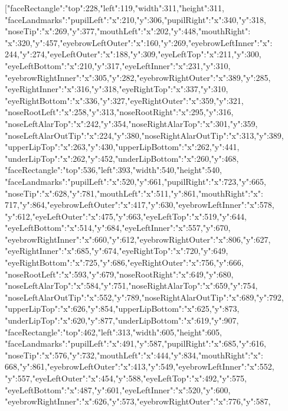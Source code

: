 \begin{myverbbox}[\footnotesize]{\vinput}
[{"faceRectangle":{"top":228,"left":119,"width":311,"height":311},
"faceLandmarks":{"pupilLeft":{"x":210,"y":306},"pupilRight":{"x":340,"y":318},
"noseTip":{"x":269,"y":377},"mouthLeft":{"x":202,"y":448},"mouthRight":
{"x":320,"y":457},"eyebrowLeftOuter":{"x":160,"y":269},"eyebrowLeftInner":{"x":
244,"y":274},"eyeLeftOuter":{"x":188,"y":309},"eyeLeftTop":{"x":211,"y":300},
"eyeLeftBottom":{"x":210,"y":317},"eyeLeftInner":{"x":231,"y":310},
"eyebrowRightInner":{"x":305,"y":282},"eyebrowRightOuter":{"x":389,"y":285},
"eyeRightInner":{"x":316,"y":318},"eyeRightTop":{"x":337,"y":310},
"eyeRightBottom":{"x":336,"y":327},"eyeRightOuter":{"x":359,"y":321},
"noseRootLeft":{"x":258,"y":313},"noseRootRight":{"x":295,"y":316},
"noseLeftAlarTop":{"x":242,"y":354},"noseRightAlarTop":{"x":301,"y":359},
"noseLeftAlarOutTip":{"x":224,"y":380},"noseRightAlarOutTip":{"x":313,"y":389},
"upperLipTop":{"x":263,"y":430},"upperLipBottom":{"x":262,"y":441},
"underLipTop":{"x":262,"y":452},"underLipBottom":{"x":260,"y":468}}},
{"faceRectangle":{"top":536,"left":393,"width":540,"height":540},
"faceLandmarks":{"pupilLeft":{"x":520,"y":661},"pupilRight":{"x":723,"y":665},
"noseTip":{"x":628,"y":781},"mouthLeft":{"x":511,"y":861},"mouthRight":{"x":
717,"y":864},"eyebrowLeftOuter":{"x":417,"y":630},"eyebrowLeftInner":{"x":578,
"y":612},"eyeLeftOuter":{"x":475,"y":663},"eyeLeftTop":{"x":519,"y":644},
"eyeLeftBottom":{"x":514,"y":684},"eyeLeftInner":{"x":557,"y":670},
"eyebrowRightInner":{"x":660,"y":612},"eyebrowRightOuter":{"x":806,"y":627},
"eyeRightInner":{"x":685,"y":674},"eyeRightTop":{"x":720,"y":649},
"eyeRightBottom":{"x":725,"y":686},"eyeRightOuter":{"x":756,"y":666},
"noseRootLeft":{"x":593,"y":679},"noseRootRight":{"x":649,"y":680},
"noseLeftAlarTop":{"x":584,"y":751},"noseRightAlarTop":{"x":659,"y":754},
"noseLeftAlarOutTip":{"x":552,"y":789},"noseRightAlarOutTip":{"x":689,"y":792},
"upperLipTop":{"x":626,"y":854},"upperLipBottom":{"x":625,"y":873},
"underLipTop":{"x":620,"y":877},"underLipBottom":{"x":619,"y":907}}},
{"faceRectangle":{"top":462,"left":313,"width":605,"height":605},
"faceLandmarks":{"pupilLeft":{"x":491,"y":587},"pupilRight":{"x":685,"y":616},
"noseTip":{"x":576,"y":732},"mouthLeft":{"x":444,"y":834},"mouthRight":{"x":
668,"y":861},"eyebrowLeftOuter":{"x":413,"y":549},"eyebrowLeftInner":{"x":552,
"y":557},"eyeLeftOuter":{"x":454,"y":588},"eyeLeftTop":{"x":492,"y":575},
"eyeLeftBottom":{"x":487,"y":601},"eyeLeftInner":{"x":520,"y":600},
"eyebrowRightInner":{"x":626,"y":573},"eyebrowRightOuter":{"x":776,"y":587},
}}
\end{myverbbox}

